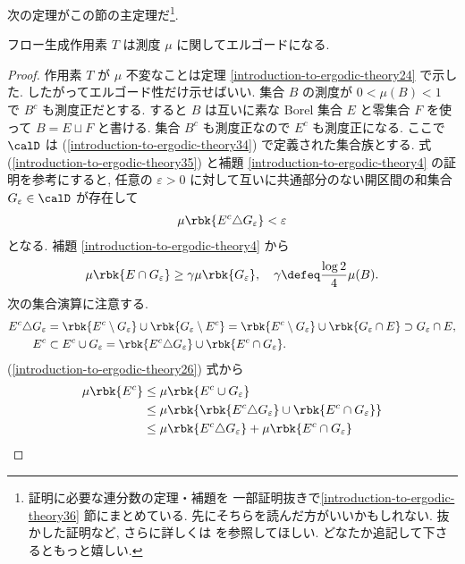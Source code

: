 \documentclass[openany, a4paper, oneside]{jsbook}
\begin{document}
次の定理がこの節の主定理だ\footnote{証明に必要な連分数の定理・補題を
一部証明抜きで\ref{introduction-to-ergodic-theory36} 節にまとめている.
先にそちらを読んだ方がいいかもしれない.
抜かした証明など, さらに詳しくは \cite[Chapter7-8]{JornSteuding1} を参照してほしい.
どなたか追記して下さるともっと嬉しい.}.
\begin{thm}
フロー生成作用素 $T$ は測度 $\mu$ に関してエルゴードになる.
\end{thm}
\begin{proof}
作用素 $T$ が $\mu$ 不変なことは定理 \ref{introduction-to-ergodic-theory24} で示した.
したがってエルゴード性だけ示せばいい.
集合 $B$ の測度が $0 < \mu(B) < 1$ で $B^{c}$ も測度正だとする.
すると $B$ は互いに素な Borel 集合 $E$ と零集合 $F$ を使って $B = E \sqcup F$ と書ける.
集合 $B^c$ も測度正なので $E^c$ も測度正になる.
ここで $\calD$ は (\ref{introduction-to-ergodic-theory34}) で定義された集合族とする.
式 (\ref{introduction-to-ergodic-theory35}) と補題 \ref{introduction-to-ergodic-theory4} の証明を参考にすると,
任意の $\varepsilon > 0$ に対して互いに共通部分のない開区間の和集合 $G_{\varepsilon} \in \calD$ が存在して
\begin{align}
 \mu \rbk{E^c \triangle G_{\varepsilon}}
 <
 \varepsilon
\end{align}
となる.
補題 \ref{introduction-to-ergodic-theory4} から
\begin{align}
 \mu \rbk{E \cap G_{\varepsilon}}
 \geq
 \gamma \mu \rbk{G_{\varepsilon}}, \quad \gamma \defeq \frac{\log 2}{4} \mu (B).
\end{align}
次の集合演算に注意する.
\begin{align}
 E^{c} \triangle G_{\varepsilon}
 &=
 \rbk{E^{c} \setminus G_{\varepsilon}} \cup \rbk{G_{\varepsilon} \setminus E^{c}}
 =
 \rbk{E^{c} \setminus G_{\varepsilon}} \cup \rbk{G_{\varepsilon} \cap E}
 \supset
 G_{\varepsilon} \cap E, \label{introduction-to-ergodic-theory25}\\
 E^{c}
 &\subset
 E^{c} \cup G_{\varepsilon}
 =
 \rbk{E^c \triangle G_{\varepsilon}} \cup \rbk{E^c \cap G_{\varepsilon}}. \label{introduction-to-ergodic-theory26}
\end{align}
(\ref{introduction-to-ergodic-theory26}) 式から
\begin{align}
 \mu \rbk{E^c}
 &\leq
 \mu \rbk{E^c \cup G_{\varepsilon}} \\
 &\leq
 \mu \rbk{\rbk{E^c \triangle G_{\varepsilon}} \cup \rbk{E^c \cap G_{\varepsilon}}} \\
 &\leq
 \mu \rbk{E^c \triangle G_{\varepsilon}} + \mu \rbk{E^c \cap G_{\varepsilon}} \\

\end{align}
\end{proof}
\end{document}
